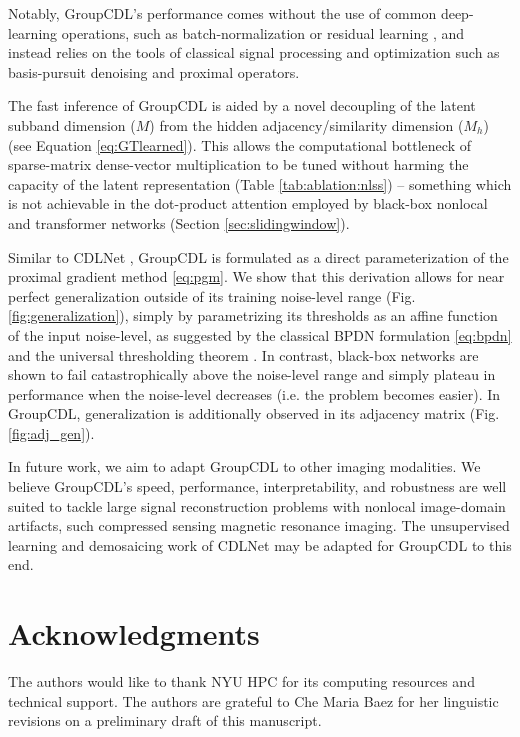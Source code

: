 \documentclass[lettersize,journal]{IEEEtran}
\begin{document}
Notably, GroupCDL's performance comes without the use of common deep-learning
operations, such as batch-normalization \cite{Ioffe2015} or residual learning
\cite{DnCNN}, and instead relies on the tools of classical signal processing and
optimization such as basis-pursuit denoising and proximal operators.

The fast inference of GroupCDL is aided by a
novel decoupling of the latent subband dimension ($M$) from the hidden
adjacency/similarity dimension ($M_h$) (see Equation \eqref{eq:GTlearned}).
This allows the computational bottleneck of sparse-matrix dense-vector
multiplication to be tuned without harming the capacity of the latent
representation (Table \ref{tab:ablation:nlss}) -- something which is not
achievable in the dot-product attention employed by black-box nonlocal and
transformer networks (Section \ref{sec:slidingwindow}).

Similar to CDLNet \cite{janjusevicCDLNet2022}, GroupCDL is formulated as a direct
parameterization of the proximal gradient method \eqref{eq:pgm}. We show that this derivation allows for near
perfect generalization outside of its training noise-level range (Fig.
\ref{fig:generalization}), simply by parametrizing its thresholds as an affine
function of the input noise-level, as suggested by the classical BPDN
formulation \eqref{eq:bpdn} and the universal thresholding theorem
\cite{Mallat, janjusevicCDLNet2022}. In contrast, black-box networks \cite{DnCNN} 
are shown to fail catastrophically above the noise-level range and simply
plateau in performance when the noise-level decreases (i.e. the problem becomes
easier). In GroupCDL, generalization is additionally observed in its adjacency matrix (Fig. \ref{fig:adj_gen}).

In future work, we aim to adapt GroupCDL to other imaging modalities. We
believe GroupCDL's speed, performance, interpretability, and robustness are
well suited to tackle large signal reconstruction problems with nonlocal
image-domain artifacts, such compressed sensing magnetic resonance imaging. The
unsupervised learning and demosaicing work of CDLNet
\cite{janjusevicCDLNet2022} may be adapted for GroupCDL to this end. 

\section*{Acknowledgments}
The authors would like to thank NYU HPC for its computing resources and
technical support. The authors are grateful to Che Maria Baez for her
linguistic revisions on a preliminary draft of this manuscript.

\ifCLASSOPTIONcaptionsoff
  \newpage
\fi


\end{document}

